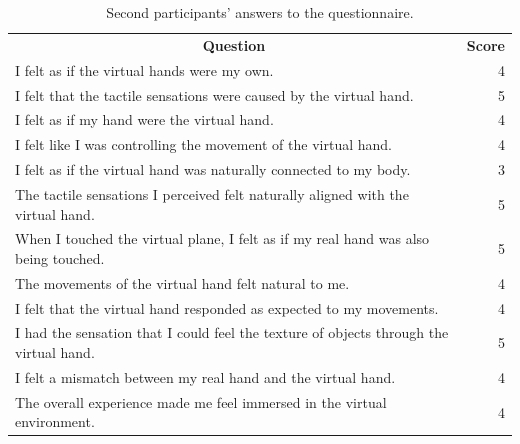 \documentclass[uplatex,
12pt, %
a4paper,
english, %
oneside,
titlepage,
singlespacing, %
liststotoc, %
headsepline,
]{MastersDoctoralThesis} %
\begin{document}
\begin{appendices}
\begin{table}[H]
  \centering
  \caption{Second participants' answers to the questionnaire.}
    \begin{tabular}{|lrrrrrrrr|r|}
    \toprule
    \multicolumn{9}{c|}{\multirow{2}[2]{*}{\textbf{Question}}}            & \multicolumn{1}{c|}{\multirow{2}[2]{*}{\textbf{Score}}} \\
    \multicolumn{9}{c|}{}                                                 &  \\
    \midrule
    \multicolumn{9}{|l|}{I felt as if the virtual hands were my own.}     & 4 \\
    \midrule
    \multicolumn{9}{|l|}{I felt that the tactile sensations were caused by the virtual hand.} & 5 \\
    \midrule
    \multicolumn{9}{|l|}{I felt as if my hand were the virtual hand.}     & 4 \\
    \midrule
    \multicolumn{9}{|l|}{I felt like I was controlling the movement of the virtual hand.} & 4 \\
    \midrule
    \multicolumn{9}{|l|}{I felt as if the virtual hand was naturally connected to my body.} & 3 \\
    \midrule
    \multicolumn{9}{|l|}{The tactile sensations I perceived felt naturally aligned with the virtual hand.} & 5 \\
    \midrule
    \multicolumn{9}{|l|}{When I touched the virtual plane, I felt as if my real hand was also being touched.} & 5 \\
    \midrule
    \multicolumn{9}{|l|}{The movements of the virtual hand felt natural to me.} & 4 \\
    \midrule
    \multicolumn{9}{|l|}{I felt that the virtual hand responded as expected to my movements.} & 4 \\
    \midrule
    \multicolumn{9}{|l|}{I had the sensation that I could feel the texture of objects through the virtual hand.} & 5 \\
    \midrule
    \multicolumn{9}{|l|}{I felt a mismatch between my real hand and the virtual hand. } & 4 \\
    \midrule
    \multicolumn{9}{|l|}{The overall experience made me feel immersed in the virtual environment.} & 4 \\
    \bottomrule
    \end{tabular}%
  \label{tab:Q_2}%
\end{table}%


\end{appendices}
\end{document}
